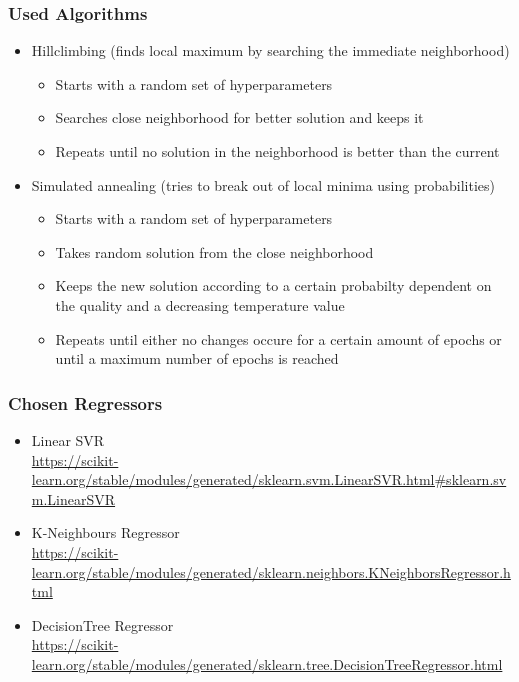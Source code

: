 \documentclass{beamer}
\begin{document}
\frame
{
  \frametitle{Used Algorithms}

  \begin{itemize}
    \item Hillclimbing
      (finds local maximum by searching the immediate neighborhood)
      \begin{itemize}
        \item Starts with a random set of hyperparameters
        \item Searches close neighborhood for better solution and keeps it
        \item Repeats until no solution in the neighborhood is better than the current
      \end{itemize}

    \item Simulated annealing
      (tries to break out of local minima using probabilities)
      \begin{itemize}
        \item Starts with a random set of hyperparameters
        \item Takes random solution from the close neighborhood
        \item Keeps the new solution according to a certain probabilty dependent on the quality and a decreasing temperature value
        \item Repeats until either no changes occure for a certain amount of epochs or until a maximum number of epochs is reached
      \end{itemize}
  \end{itemize}
}

\frame
{
  \frametitle{Chosen Regressors}

  \begin{itemize}
    \item Linear SVR\\
    \url{https://scikit-learn.org/stable/modules/generated/sklearn.svm.LinearSVR.html\#sklearn.svm.LinearSVR}
    \item K-Neighbours Regressor\\
    \url{https://scikit-learn.org/stable/modules/generated/sklearn.neighbors.KNeighborsRegressor.html}
    \item DecisionTree Regressor\\
    \url{https://scikit-learn.org/stable/modules/generated/sklearn.tree.DecisionTreeRegressor.html}
  \end{itemize}
}

\end{document}
